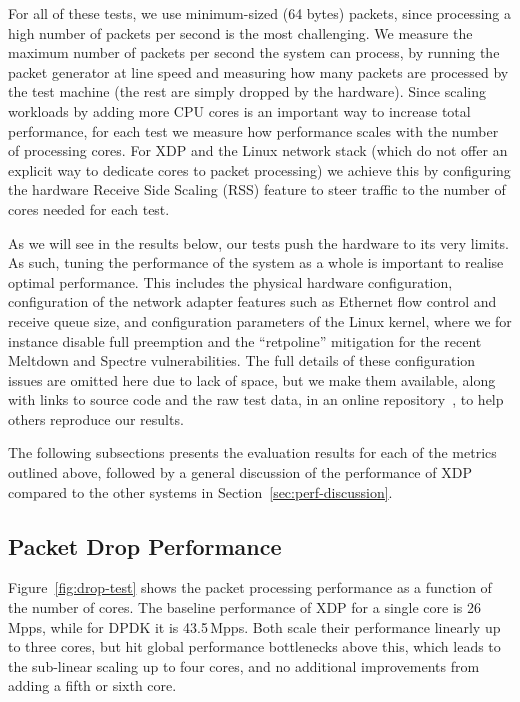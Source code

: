 \documentclass[10pt,sigconf,anonymous]{acmart}
\begin{document}
For all of these tests, we use minimum-sized (64 bytes) packets, since
processing a high number of packets per second is the most challenging. We
measure the maximum number of packets per second the system can process, by
running the packet generator at line speed and measuring how many packets are
processed by the test machine (the rest are simply dropped by the hardware).
Since scaling workloads by adding more CPU cores is an important way to increase
total performance, for each test we measure how performance scales with the
number of processing cores. For XDP and the Linux network stack (which do not
offer an explicit way to dedicate cores to packet processing) we achieve this by
configuring the hardware Receive Side Scaling (RSS) feature to steer traffic to
the number of cores needed for each test.

As we will see in the results below, our tests push the hardware to its very
limits. As such, tuning the performance of the system as a whole is important to
realise optimal performance. This includes the physical hardware configuration,
configuration of the network adapter features such as Ethernet flow control and
receive queue size, and configuration parameters of the Linux kernel, where we
for instance disable full preemption and the ``retpoline'' mitigation for the
recent Meltdown and Spectre vulnerabilities. The full details of these
configuration issues are omitted here due to lack of space, but we make them
available, along with links to source code and the raw test data, in an online
repository~\cite{test-data}, to help others reproduce our results.

The following subsections presents the evaluation results for each of the
metrics outlined above, followed by a general discussion of the performance of
XDP compared to the other systems in Section~\ref{sec:perf-discussion}.

\subsection{Packet Drop Performance}
\label{sec:basel-pack-proc}
Figure~\ref{fig:drop-test} shows the packet processing performance as a function
of the number of cores. The baseline performance of XDP for a single core is
26\,Mpps, while for DPDK it is 43.5\,Mpps. Both scale their performance linearly
up to three cores, but hit global performance bottlenecks above this, which
leads to the sub-linear scaling up to four cores, and no additional improvements
from adding a fifth or sixth core.
\end{document}
